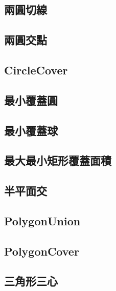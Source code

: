 \subsection{兩圓切線}


\subsection{兩圓交點}


\subsection{CircleCover}


\subsection{最小覆蓋圓}


\subsection{最小覆蓋球}


\subsection{最大最小矩形覆蓋面積}


\subsection{半平面交}


\subsection{PolygonUnion}


\subsection{PolygonCover}


\subsection{三角形三心}


